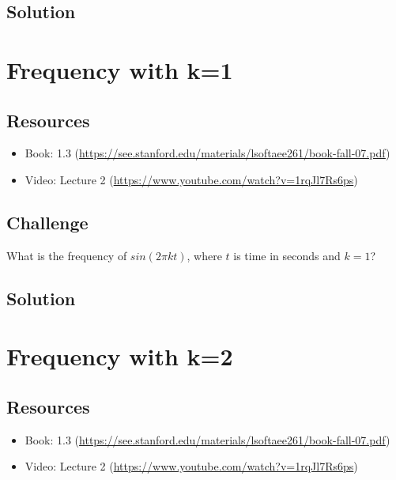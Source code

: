 \subsection*{Solution}





\newpage

\section{Frequency with k=1}

\subsection*{Resources}
\begin{itemize}
    \item Book: 1.3 (\url{https://see.stanford.edu/materials/lsoftaee261/book-fall-07.pdf})
    \item Video: Lecture 2 (\url{https://www.youtube.com/watch?v=1rqJl7Rs6ps})
\end{itemize}

\subsection*{Challenge}
What is the frequency of $sin(2 \pi k t)$, where $t$ is time in seconds and $k=1$?

\subsection*{Solution}





\newpage

\section{Frequency with k=2}

\subsection*{Resources}
\begin{itemize}
    \item Book: 1.3 (\url{https://see.stanford.edu/materials/lsoftaee261/book-fall-07.pdf})
    \item Video: Lecture 2 (\url{https://www.youtube.com/watch?v=1rqJl7Rs6ps})
\end{itemize}

